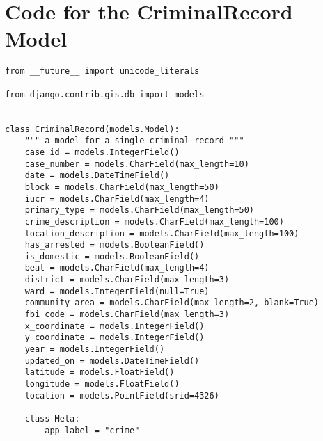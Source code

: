 \chapter{Code for the CriminalRecord Model} \label{code-criminalrecord}
\begin{small}
\begin{verbatim}
from __future__ import unicode_literals

from django.contrib.gis.db import models


class CriminalRecord(models.Model):
    """ a model for a single criminal record """
    case_id = models.IntegerField()
    case_number = models.CharField(max_length=10)
    date = models.DateTimeField()
    block = models.CharField(max_length=50)
    iucr = models.CharField(max_length=4)
    primary_type = models.CharField(max_length=50)
    crime_description = models.CharField(max_length=100)
    location_description = models.CharField(max_length=100)
    has_arrested = models.BooleanField()
    is_domestic = models.BooleanField()
    beat = models.CharField(max_length=4)
    district = models.CharField(max_length=3)
    ward = models.IntegerField(null=True)
    community_area = models.CharField(max_length=2, blank=True)
    fbi_code = models.CharField(max_length=3)
    x_coordinate = models.IntegerField()
    y_coordinate = models.IntegerField()
    year = models.IntegerField()
    updated_on = models.DateTimeField()
    latitude = models.FloatField()
    longitude = models.FloatField()
    location = models.PointField(srid=4326)

    class Meta:
        app_label = "crime"

\end{verbatim}
\end{small}
